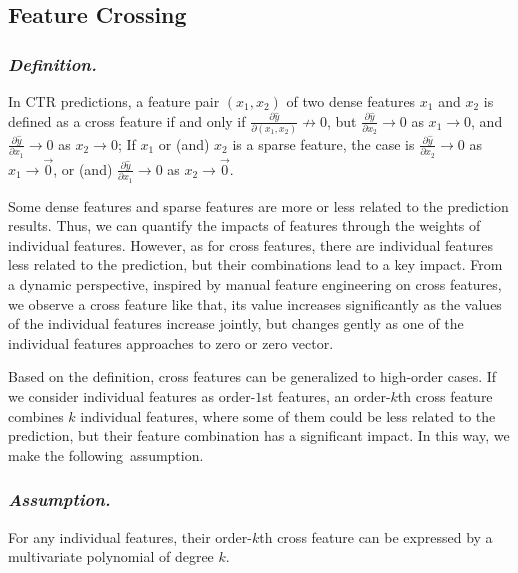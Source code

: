 \documentclass[letterpaper]{article} \usepackage{aaai21}  \usepackage{times}  \usepackage{helvet} \usepackage{courier}  \usepackage[hyphens]{url}  \usepackage{graphicx} \urlstyle{rm} \def\UrlFont{\rm}  \usepackage{natbib}  \usepackage{caption} \frenchspacing  \setlength{\pdfpagewidth}{8.5in}  \setlength{\pdfpageheight}{11in}  \usepackage{graphicx}
\begin{document}
\subsection{Feature Crossing}
\vspace{-0.1cm}
\subsubsection{{\em Definition. }}

In CTR predictions, a feature pair $(x_1, x_2)$ of two dense features $x_1$ and $x_2$ is defined as a cross feature if and only if $\frac{\partial \hat{y}}{\partial (x_1, x_2)} \nrightarrow 0$, but $\frac{\partial \hat{y}}{\partial x_2} \rightarrow 0$ as $x_1 \rightarrow 0$, and $\frac{\partial \hat{y}}{\partial x_1} \rightarrow 0$ as $x_2 \rightarrow 0$; If $x_1$ or (and) $x_2$ is a sparse feature, the case is $\frac{\partial \hat{y}}{\partial x_2} \rightarrow 0$ as $x_1 \rightarrow \vec{0}$, or (and) $\frac{\partial \hat{y}}{\partial x_1} \rightarrow 0$ as $x_2 \rightarrow \vec{0}$.  


Some dense features and sparse features are more or less related to the prediction results. Thus, we can quantify the impacts of features through the weights of individual features. However, as for cross features, there are individual features less related to the prediction, but their combinations lead to a key impact. From a dynamic perspective, inspired by manual feature engineering on cross features, we observe a cross feature like that, its value increases significantly as the values of the individual features increase jointly, but changes gently as one of the individual features approaches to zero or zero vector. 

Based on the definition, cross features can be generalized to high-order cases. If we consider individual features as order-$1$st features, an order-$k$th cross feature combines $k$ individual features, where some of them could be less related to the prediction, but their feature combination has a significant impact. In this way, we make the following~assumption.

\vspace{-0.2cm}
\subsubsection{{\em Assumption. }}

For any individual features, their order-$k$th cross feature can be expressed by a multivariate polynomial of degree $k$.
\end{document}
